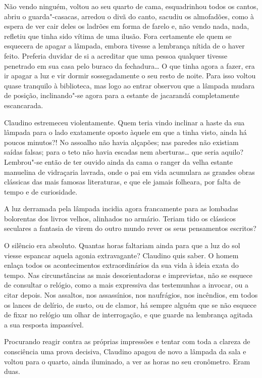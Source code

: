 Não vendo ninguém, voltou ao seu quarto de cama, esquadrinhou todos os
cantos, abriu o guarda"-casacas, arredou o divã do canto, sacudiu os
almofadões, como à espera de ver cair deles os ladrões em forma de
farelo e, não vendo nada, nada, refletiu que tinha sido vítima de uma
ilusão. Fora certamente ele quem se esquecera de apagar a lâmpada,
embora tivesse a lembrança nítida de o haver feito. Preferia duvidar de
si a acreditar que uma pessoa qualquer tivesse penetrado em sua casa
pelo buraco da fechadura\ldots{} O que tinha agora a fazer, era ir apagar a
luz e vir dormir sossegadamente o seu resto de noite. Para isso voltou
quase tranquilo à biblioteca, mas logo ao entrar observou que a lâmpada
mudara de posição, inclinando"-se agora para a estante de jacarandá
completamente escancarada.

Claudino estremeceu violentamente. Quem teria vindo inclinar a haste da
sua lâmpada para o lado exatamente oposto àquele em que a tinha visto,
ainda há poucos minutos?! No assoalho não havia alçapões; nas paredes
não existiam saídas falsas; para o teto não havia escadas nem
aberturas\ldots{} que seria aquilo? Lembrou"-se então de ter ouvido ainda da
cama o ranger da velha estante manuelina de vidraçaria lavrada, onde o
pai em vida acumulara as grandes obras clássicas das mais famosas
literaturas, e que ele jamais folheara, por falta de tempo e de
curiosidade.

A luz derramada pela lâmpada incidia agora francamente para as lombadas
bolorentas dos livros velhos, alinhados no armário. Teriam tido os
clássicos seculares a fantasia de virem do outro mundo rever os seus
pensamentos escritos?

O silêncio era absoluto. Quantas horas faltariam ainda para que a luz do
sol viesse espancar aquela agonia extravagante? Claudino quis saber. O
homem enlaça todos os acontecimentos extraordinários da sua vida à ideia
exata do tempo. Nas circunstâncias as mais desorientadoras e
imprevistas, não se esquece de consultar o relógio, como a mais
expressiva das testemunhas a invocar, ou a citar depois. Nos assaltos,
nos assassínios, nos naufrágios, nos incêndios, em todos os lances de
delírio, de susto, ou de clamor, há sempre alguém que se não esquece de
fixar no relógio um olhar de interrogação, e que guarde na lembrança
agitada a sua resposta impassível.

Procurando reagir contra as próprias impressões e tentar com toda a
clareza de consciência uma prova decisiva, Claudino apagou de novo a
lâmpada da sala e voltou para o quarto, ainda iluminado, a ver as horas
no seu cronômetro. Eram duas.

